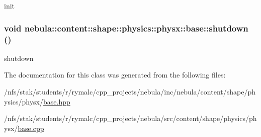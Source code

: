 init \hypertarget{classnebula_1_1content_1_1shape_1_1physics_1_1physx_1_1base_a14492eda26cb649affa5a03d6d771137}{
\subsubsection[{shutdown}]{\setlength{\rightskip}{0pt plus 5cm}void nebula::content::shape::physics::physx::base::shutdown ()}}
\label{classnebula_1_1content_1_1shape_1_1physics_1_1physx_1_1base_a14492eda26cb649affa5a03d6d771137}


shutdown 

The documentation for this class was generated from the following files:\begin{DoxyCompactItemize}
\item 
/nfs/stak/students/r/rymalc/cpp\_\-projects/nebula/inc/nebula/content/shape/physics/physx/\hyperlink{inc_2nebula_2content_2shape_2physics_2physx_2base_8hpp}{base.hpp}\item 
/nfs/stak/students/r/rymalc/cpp\_\-projects/nebula/src/content/shape/physics/physx/\hyperlink{src_2content_2shape_2physics_2physx_2base_8cpp}{base.cpp}\end{DoxyCompactItemize}
